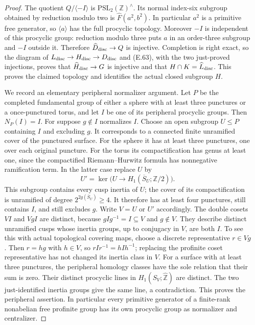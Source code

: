 \begin{proof}
The quotient $Q/\langle-I\rangle$ is
$\mathrm{PSL}_2(\mathbb Z)^{\wedge}$.
Its normal index-six subgroup obtained by reduction
modulo two is $\widehat F(a^2,b^2)$.  In particular
$a^2$ is a primitive free generator, so
$\langle a\rangle$ has the full procyclic topology.
Moreover $-I$ is independent of this procyclic
group: reduction modulo three puts $a$ in an
order-three subgroup and $-I$ outside it.  Therefore
$\widehat D_{\rm disc}\to Q$ is injective.
Completion is right exact, so the diagram of
$L_{\rm disc}\to H_{\rm disc}\to D_{\rm disc}$
and (E.63), with the two just-proved injections,
proves that $\widehat H_{\rm disc}\to G$ is
injective and that $H\cap K=\widehat L_{\rm disc}$.
This proves the claimed topology and identifies
the actual closed subgroup $H$.

We record an elementary peripheral normalizer
argument.  Let $P$ be the completed fundamental
group of either a sphere with at least three punctures or a
once-punctured torus, and let $I$ be one of its
peripheral procyclic groups.  Then $N_P(I)=I$.
For suppose $g\notin I$ normalizes $I$.  Choose
an open subgroup $U\leq P$ containing $I$ and
excluding $g$.  It corresponds to a connected
finite unramified cover of the punctured surface.
For the sphere it has at least three punctures,
one over each original puncture.  For the torus
its compactification has genus at least one,
since the compactified Riemann--Hurwitz formula
has nonnegative ramification term.  In the latter
case replace $U$ by
\[
 U'=\ker\bigl(U\longrightarrow
      H_1(\overline S_U;\mathbb Z/2)\bigr).
\]
This subgroup contains every cusp inertia of $U$;
the cover of its compactification is unramified
of degree $2^{2g(\overline S_U)}\geq4$.  It
therefore has at least four punctures, still
contains $I$, and still excludes $g$.
Write $V=U$ or $U'$ accordingly.  The double
cosets $VI$ and $VgI$ are distinct, because
$gIg^{-1}=I\subseteq V$ and $g\notin V$.
They describe distinct unramified cusps whose
inertia groups, up to conjugacy in $V$, are
both $I$.  To see this with actual topological
covering maps, choose a discrete representative
$r\in Vg$.  Then $r=hg$ with $h\in V$, so
$rIr^{-1}=hIh^{-1}$; replacing the profinite
coset representative has not changed its
inertia class in $V$.
For a surface with at least three punctures,
the peripheral homology classes have the sole
relation that their sum is zero.  Their distinct
procyclic lines in
$H_1(S_V;\widehat{\mathbb Z})$ are distinct.
The two just-identified inertia groups give the
same line, a contradiction.  This proves the
peripheral assertion.  In particular every
primitive generator of a finite-rank nonabelian free profinite
group has its own procyclic group as normalizer
and centralizer.


\end{proof}
